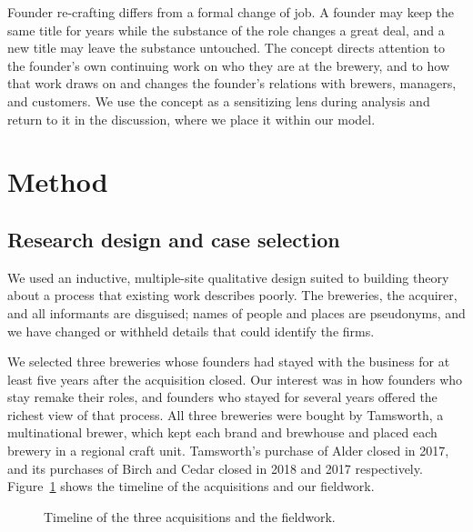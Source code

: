 \documentclass[12pt]{article}
\begin{document}
Founder re-crafting differs from a formal change of job. A founder may keep the same title for years while the substance of the role changes a great deal, and a new title may leave the substance untouched. The concept directs attention to the founder's own continuing work on who they are at the brewery, and to how that work draws on and changes the founder's relations with brewers, managers, and customers. We use the concept as a sensitizing lens during analysis and return to it in the discussion, where we place it within our model.

\section{Method}

\subsection{Research design and case selection}

We used an inductive, multiple-site qualitative design suited to building theory about a process that existing work describes poorly. The breweries, the acquirer, and all informants are disguised; names of people and places are pseudonyms, and we have changed or withheld details that could identify the firms.

We selected three breweries whose founders had stayed with the business for at least five years after the acquisition closed. Our interest was in how founders who stay remake their roles, and founders who stayed for several years offered the richest view of that process. All three breweries were bought by Tamsworth, a multinational brewer, which kept each brand and brewhouse and placed each brewery in a regional craft unit. Tamsworth's purchase of Alder closed in 2017, and its purchases of Birch and Cedar closed in 2018 and 2017 respectively. Figure~\ref{fig:timeline} shows the timeline of the acquisitions and our fieldwork.

\begin{figure}[htbp]
\centering
{}
\caption{Timeline of the three acquisitions and the fieldwork.}
\label{fig:timeline}
\end{figure}
\end{document}
